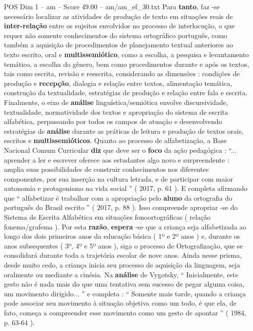 \begin{textsample}{POS Dim 1 – am – Score 49.00 – am/am\_ef\_30.txt}
Para \textbf{tanto}, faz -se necessário localizar as atividades de produção de texto em situações reais de \textbf{inter-relação} entre os sujeitos envolvidos no processo de interlocução, o que requer não somente conhecimentos do sistema ortográfico português, como também a aquisição de procedimentos de planejamento textual anteriores ao texto escrito, oral e \textbf{multissemiótico}, como a escolha, a pesquisa e levantamento temático, a escolha do gênero, bem como procedimentos durante e após os textos, tais como escrita, revisão e reescrita, considerando as dimensões : condições de produção e \textbf{recepção}, dialogia e relação entre textos, alimentação temática, construção da textualidade, estratégias de produção e relação entre fala e escrita.
Finalmente, o eixo de \textbf{análise} linguística/semiótica envolve discursividade, textualidade, normatividade dos textos e apropriação do sistema de escrita alfabética, perpassando por todos os campos de atuação e desenvolvendo estratégias de \textbf{análise} durante as práticas de leitura e produção de textos orais, escritos e \textbf{multissemióticos}.
Quanto ao processo de alfabetização, a Base Nacional Comum Curricular \textbf{diz} que deve ser o \textbf{foco} da ação pedagógica : “... aprender a ler e escrever oferece aos estudantes algo novo e surpreendente : amplia suas possibilidades de construir conhecimentos nos diferentes componentes, por sua inserção na cultura letrada, e de participar com maior autonomia e protagonismo na vida social ” ( 2017, p. 61 ).
E completa afirmando que “ alfabetizar é trabalhar com a apropriação pelo \textbf{aluno} da ortografia do português do Brasil escrito ” ( 2017, p. 88 ).
Isso compreende apropriar -se do Sistema de Escrita Alfabética em situações fonoortográficas ( relação fonema/grafema ).
Por esta \textbf{razão}, \textbf{espera} -se que a criança seja alfabetizada ao longo dos dois primeiros anos da educação básica ( 1º e 2º anos ) e, durante os anos subsequentes ( 3º, 4º e 5º anos ), siga o processo de Ortografização, que se consolidará durante toda a trajetória escolar de nove anos.
Ainda nesse prisma, desde muito cedo, a criança inicia seu processo de aquisição da linguagem, seja oralmente ou mediante a cinésia.
Na \textbf{análise} de Vygotsky, “ Inicialmente, este gesto não é nada mais do que uma tentativa sem sucesso de pegar alguma coisa, um movimento dirigido... ” e completa : “ Somente mais tarde, quando a criança pode associar seu movimento à situação objetiva como um todo, é que ela, de fato, começa a compreender esse movimento como um gesto de apontar ” ( 1984, p. 63-64 ).

\end{textsample}

